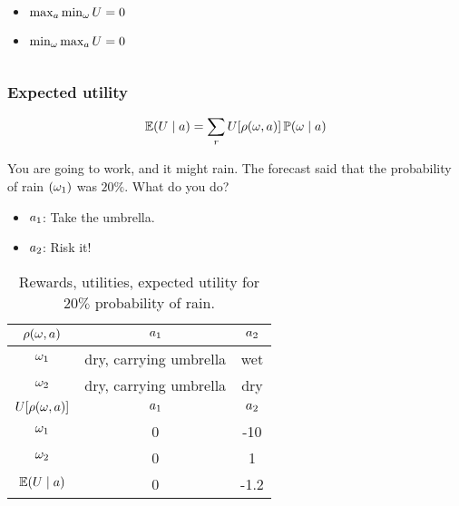 \begin{frame}
\begin{example}
\begin{columns}
\begin{column}{0.5\textwidth}
        \begin{itemize}
        \item<2-> $\max_a \min_\omega U = 0$
        \item<3-> $\min_\omega \max_a U = 0$
        \end{itemize}
      \end{column}

    \end{columns}
  \end{example}
\end{frame}



\begin{frame}
  \frametitle{Expected utility}
  \[
  \mathop{\mbox{\ensuremath{\mathbb{E}}}}\nolimits (U \mid a) = \sum_r U[\rho(\omega, a)] \mathop{\mbox{\ensuremath{\mathbb{P}}}}\nolimits(\omega \mid a)
  \]
  \begin{example}%
    You are going to work, and it might rain. The forecast said that
    the probability of rain $(\omega_1)$ was $20\%$. What do you do?
    \begin{itemize}
    \item $a_1$: Take the umbrella.
    \item $a_2$: Risk it!
    \end{itemize}
    \begin{table}
      \centering
      \begin{tabular}{c|c|c}
        $\rho(\omega,a)$ & $a_1$ & $a_2$ \\ %
        \hline
        $\omega_1$ & dry, carrying umbrella & wet\\
        $\omega_2$ & dry, carrying umbrella & dry\\
        \hline
        \hline
        $U[\rho(\omega,a)]$ & $a_1$ & $a_2$ \\
        \hline
        $\omega_1$ & 0 & -10\\
        $\omega_2$ & 0 & 1\\
        \hline
        \hline
        $\mathop{\mbox{\ensuremath{\mathbb{E}}}}\nolimits(U \mid a)$ & 0 &  -1.2 \\ 
      \end{tabular}
      \caption{Rewards, utilities, expected utility for $20\%$ probability of rain.}
      \label{tab:rain-utility-function}
    \end{table}
  \end{example}
\end{frame}





